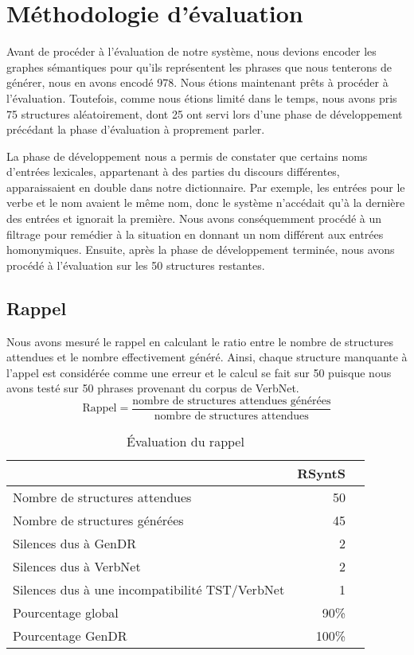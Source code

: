 
\section{Méthodologie d'évaluation}

Avant de procéder à l'évaluation de notre système, nous devions encoder les graphes sémantiques pour qu'ils représentent les phrases que nous tenterons de générer, nous en avons encodé 978. Nous étions maintenant prêts à procéder à l'évaluation. Toutefois, comme nous étions limité dans le temps, nous avons pris 75 structures aléatoirement, dont 25 ont servi lors d'une phase de développement précédant la phase d'évaluation à proprement parler.

La phase de développement nous a permis de constater que certains noms d'entrées lexicales, appartenant à des parties du discours différentes, apparaissaient en double dans notre dictionnaire. Par exemple, les entrées pour le verbe  et le nom  avaient le même nom, donc le système n'accédait qu'à la dernière des entrées et ignorait la première. Nous avons conséquemment procédé à un filtrage pour remédier à la situation en donnant un nom différent aux entrées homonymiques. Ensuite, après la phase de développement terminée, nous avons procédé à l'évaluation sur les 50 structures restantes.
                              
\subsection{Rappel}
Nous avons mesuré le rappel en calculant le ratio entre le nombre de structures attendues et le nombre effectivement généré. Ainsi, chaque structure manquante à l'appel est considérée comme une erreur et le calcul se fait sur 50 puisque nous avons testé sur 50 phrases provenant du corpus de VerbNet.
\[\text{Rappel} = \frac{\text{nombre de structures attendues générées}}{\text{nombre de structures attendues}}\]

\begin{table}
\caption{Évaluation du rappel}
\begin{tabular}{lrr}
 \toprule
   & RSyntS\\
 \midrule
 Nombre de structures attendues   & 50\\
 Nombre de structures générées &  45\\
 Silences dus à GenDR & 2\\
 Silences dus à VerbNet    & 2\\
 Silences dus à une incompatibilité TST/VerbNet & 1\\
 \midrule
Pourcentage global & 90\% \\
Pourcentage GenDR & 100\% \\
\bottomrule
\end{tabular}
\end{table}

